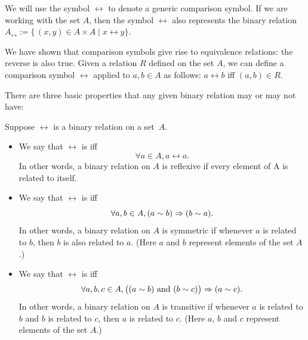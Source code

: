 We will use the symbol $\rel$ to denote a generic comparison symbol. If we are working with the set $A$, then the symbol $\rel$ also represents the binary relation $A_\rel := \{\, (x,y) \in A \times A \mid x \rel y \}$.

We have shown that comparison symbols give rise to equivalence relations: the reverse is also true. Given a relation $R$ defined on the set $A$, we can define a comparison symbol $\rel$ applied to $a,b \in A$ as follows:
$ a \rel b$ iff $(a,b) \in R$.

There are three basic properties that any given binary relation may or may not have:

\begin{defn} \label{RefSymmTransDefn}
Suppose $\rel$ is a binary relation on a set~$A$. 
\begin{itemize}
\item We say that $\rel$ is  iff 
	$$ \forall a \in A, a \rel a .$$
In other words, a binary relation on $A$ is reflexive if  every element of A is related to itself.
\item We say that $\rel$ is  iff 
	$$ \forall a,b \in A,  (a \sim b) \Rightarrow (b \sim a)  .$$
In other words, a binary relation on $A$ is symmetric if  whenever $a$ is related to $b$, then $b$ is also related to $a$.  (Here $a$ and $b$ represent elements of the set $A$.)
\item We say that $\rel$ is  iff 
	$$ \forall a,b,c \in A,  \bigl( (a \sim b) \mbox{ and } (b \sim c) \bigr) \Rightarrow (a \sim c)  .$$
In other words, a binary relation on $A$ is transitive if  whenever $a$ is related to $b$ and $b$ is related to $c$, then $a$ is related to $c$.  (Here $a$, $b$ and $c$ represent elements of the set $A$.)
\end{itemize}
\end{defn}

